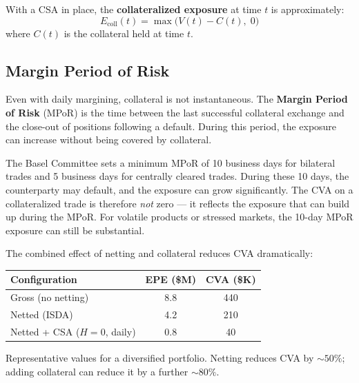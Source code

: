 \documentclass[11pt, a4paper]{article}
\theoremstyle{definition}
\theoremstyle{plain}
\theoremstyle{remark}
\begin{document}
With a CSA in place, the \textbf{collateralized exposure} at time $t$ is approximately:
\begin{equation}\label{eq:collateral-exposure}
    E_{\text{coll}}(t) = \max\bigl(V(t) - C(t),\; 0\bigr)
\end{equation}
where $C(t)$ is the collateral held at time $t$.

\subsection{Margin Period of Risk}

Even with daily margining, collateral is not instantaneous.
The \textbf{Margin Period of Risk} (MPoR) is the time between the last successful
collateral exchange and the close-out of positions following a default.
During this period, the exposure can increase without being covered by collateral.

\begin{warningbox}
The Basel Committee sets a minimum MPoR of 10 business days for bilateral trades
and 5 business days for centrally cleared trades.
During these 10 days, the counterparty may default, and the exposure can grow significantly.
The CVA on a collateralized trade is therefore \emph{not} zero --- it reflects the
exposure that can build up during the MPoR\@.
For volatile products or stressed markets, the 10-day MPoR exposure can still be
substantial.
\end{warningbox}

\begin{keyresult}
The combined effect of netting and collateral reduces CVA dramatically:
\begin{center}
\begin{tabular}{@{}lcc@{}}
\toprule
\textbf{Configuration} & \textbf{EPE (\$M)} & \textbf{CVA (\$K)} \\
\midrule
Gross (no netting)           & 8.8 & 440 \\
Netted (ISDA)                & 4.2 & 210 \\
Netted + CSA ($H = 0$, daily) & 0.8 &  40 \\
\bottomrule
\end{tabular}
\end{center}
Representative values for a diversified portfolio.
Netting reduces CVA by ${\sim}50\%$; adding collateral can reduce it by a further
${\sim}80\%$.
\end{keyresult}

\end{document}
